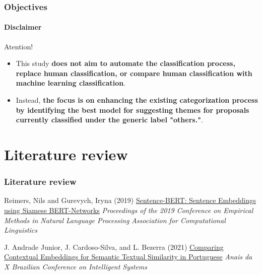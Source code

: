 \begin{frame}
	\frametitle{Objectives}
	\framesubtitle{Disclaimer}
		
	\begin{alertblock}{Atention!} 
		\begin{itemize}
			\item This study \textbf{does not aim to automate the classification process, replace human classification, or compare human classification with machine learning classification}. 
			
			\item Instead, \textbf{the focus is on enhancing the existing categorization process by identifying the best model for suggesting themes for proposals currently classified under the generic label "others."}.
		\end{itemize}
	\end{alertblock}
	
	
	
\end{frame}





\section{Literature review}
\begin{frame}
	\frametitle{Literature review}
	
	\begin{thebibliography}{99} %
	\footnotesize %
		\scriptsize
	
		Reimers, Nils and Gurevych, Iryna (2019)
		\newblock \href{http://arxiv.org/abs/1908.10084}{Sentence-BERT: Sentence Embeddings using Siamese BERT-Networks}
		\newblock \emph{Proceedings of the 2019 Conference on Empirical Methods in Natural Language Processing} 
		\newblock \emph{Association for Computational Linguistics} 
		
		J. Andrade Junior, J. Cardoso-Silva, and L. Bezerra (2021)
		\newblock \href{https://core.ac.uk/download/491169432.pdf}{Comparing Contextual Embeddings for	Semantic Textual Similarity in Portuguese}
		\newblock \scriptsize \emph{Anais da X Brazilian Conference on Intelligent Systems} 
		
		\normalsize		 

	\end{thebibliography}

	
	
\end{frame}
